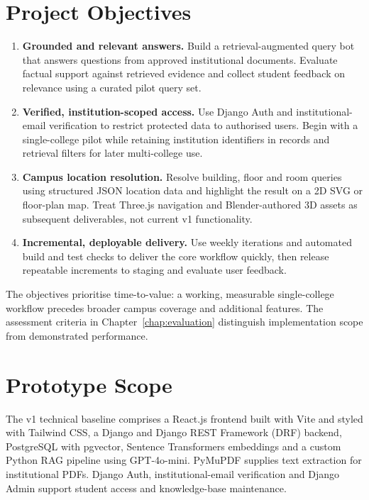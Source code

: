 \documentclass{tietreport}
\begin{document}
\section{Project Objectives}

\begin{enumerate}
  \item \textbf{Grounded and relevant answers.} Build a retrieval-augmented
    query bot that answers questions from approved institutional documents.
    Evaluate factual support against retrieved evidence and collect student
    feedback on relevance using a curated pilot query set.
  \item \textbf{Verified, institution-scoped access.} Use Django Auth and
    institutional-email verification to restrict protected data to authorised
    users. Begin with a single-college pilot while retaining institution
    identifiers in records and retrieval filters for later multi-college use.
  \item \textbf{Campus location resolution.} Resolve building, floor and room
    queries using structured JSON location data and highlight the result on
    a 2D SVG or floor-plan map. Treat Three.js navigation and Blender-authored
    3D assets as subsequent deliverables, not current v1 functionality.
  \item \textbf{Incremental, deployable delivery.} Use weekly iterations and
    automated build and test checks to deliver the core workflow quickly,
    then release repeatable increments to staging and evaluate user feedback.
\end{enumerate}

The objectives prioritise time-to-value: a working, measurable single-college
workflow precedes broader campus coverage and additional features. The
assessment criteria in Chapter~\ref{chap:evaluation} distinguish implementation
scope from demonstrated performance.

\section{Prototype Scope}

The v1 technical baseline comprises a React.js frontend built with Vite and
styled with Tailwind CSS, a Django and Django REST Framework (DRF) backend,
PostgreSQL with pgvector, Sentence Transformers embeddings and a custom Python
RAG pipeline using GPT-4o-mini. PyMuPDF supplies text extraction for institutional
PDFs. Django Auth, institutional-email verification and Django Admin support
student access and knowledge-base maintenance.
\end{document}

